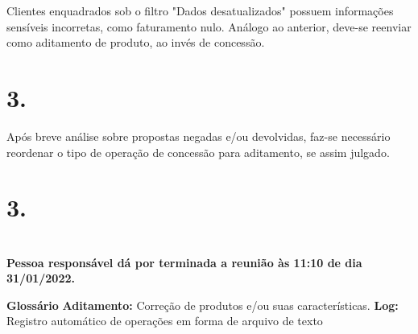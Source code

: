 \documentclass[a4paper, 11pt]{article}
\begin{document}
Clientes enquadrados sob o filtro "Dados desatualizados" possuem informações sensíveis incorretas, como faturamento nulo. Análogo ao anterior, deve-se reenviar como aditamento de produto, ao invés de concessão.


\section*{3. }
Após breve análise sobre propostas negadas e/ou devolvidas, faz-se necessário reordenar o tipo de operação de concessão para aditamento, se assim julgado.





\section*{3.}

 
 \section*{}
\textbf{Pessoa responsável dá por terminada a reunião às 11:10 de dia 31/01/2022.}

\setlength{\textwidth}{14cm}\textbf{Glossário}
\textbf{Aditamento:} Correção de produtos e/ou suas características.
\textbf{Log:} Registro automático de operações em forma de arquivo de texto




\end{document}
